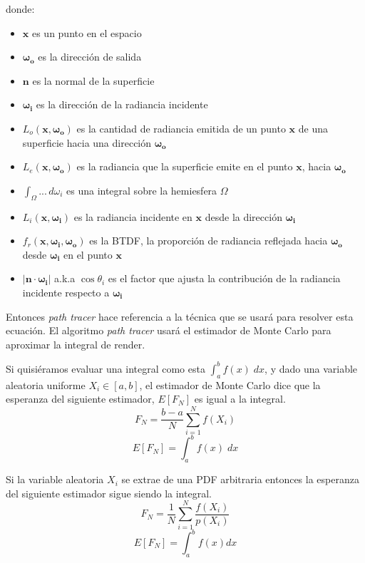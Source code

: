 \documentclass{article}
\begin{document}
donde:
\begin{itemize}
  \item \(\mathbf{x}\) es un punto en el espacio
  \item \(\mathbf{\omega_{o}}\) es la dirección de salida
  \item \(\mathbf{n}\) es la normal de la superficie
  \item \(\mathbf{\omega_{i}}\) es la dirección de la radiancia incidente
  \item \(L_o(\mathbf{x}, \mathbf{\omega_{o}})\) es la cantidad de radiancia
        emitida de un punto \(\mathbf{x}\) de una superficie hacia una dirección
        \(\mathbf{\omega_{o}}\)
  \item \(L_e(\mathbf{x}, \mathbf{\omega_{o}})\) es la radiancia que la
        superficie emite en el punto \(\mathbf{x}\), hacia
        \(\mathbf{\omega_{o}}\)
  \item \(\int_{\Omega} ... \, d\omega_{i}\) es una integral sobre la hemiesfera
        \(\Omega\)
  \item \(L_i(\mathbf{x}, \mathbf{\omega_{i}}) \) es la radiancia incidente en
        \(\mathbf{x}\) desde la dirección \(\mathbf{\omega_{i}}\)
  \item \(f_r(\mathbf{x}, \mathbf{\omega_{i}}, \mathbf{\omega_{o}}) \) es la
        BTDF, la proporción de radiancia reflejada hacia \(\mathbf{\omega_{o}}\)
        desde \(\mathbf{\omega_{i}}\) en el punto \(\mathbf{x}\)
  \item \(|\mathbf{n} \cdot \mathbf{\omega_{i}}|\) a.k.a \(\cos\theta_{i}\) es
        el factor que ajusta la contribución de la radiancia incidente respecto
        a \(\mathbf{\omega_{i}}\)
\end{itemize}

Entonces \textit{path tracer} hace referencia a la técnica que se usará para
resolver esta ecuación. El algoritmo \textit{path tracer} usará el estimador de
Monte Carlo para aproximar la integral de render.

Si quisiéramos evaluar una integral como esta \(\int^{b}_{a} f(x) \; dx\), y
dado una variable aleatoria uniforme \(X_{i} \in [a, b]\), el estimador de Monte
Carlo dice que la esperanza del siguiente estimador, \(E[F_{N}]\) es igual a la
integral.
\[F_{N}=\frac{b-a}{N} \sum_{i=1}^{N} f(X_{i}) \]
\[E[F_{N}]= \int^{b}_{a} f(x) \; dx\]

Si la variable aleatoria \(X_{i}\) se extrae de una PDF arbitraria entonces la
esperanza del siguiente estimador sigue siendo la integral.
\begin{equation}
  F_{N}=\frac{1}{N} \sum_{i=1}^{N} \frac{f(X_{i})}{p(X_{i})}
\end{equation}
\begin{equation}
  E[F_{N}]= \int^{b}_{a} f(x) dx
\end{equation}
\end{document}
